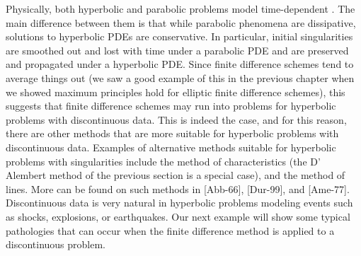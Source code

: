 \documentclass[../main.tex]{subfiles}
\begin{document}
Physically, both hyperbolic and parabolic problems model time-dependent 
. The main difference between them is that while parabolic phenomena are dissipative, solutions to hyperbolic PDEs are conservative. In particular, initial singularities are smoothed out and lost with time under a parabolic PDE and are preserved and propagated under a hyperbolic PDE. Since finite difference schemes tend to average things out (we saw a good example of this in the previous chapter when we showed maximum principles hold for elliptic finite difference schemes), this suggests that finite difference schemes may run into problems for hyperbolic problems with discontinuous data. This is indeed the case, and for this reason, there are other methods that are more suitable for hyperbolic problems with discontinuous data. Examples of alternative methods suitable for hyperbolic problems with singularities include the method of characteristics (the D' Alembert method of the previous section is a special case), and the method of lines. More can be found on such methods in [Abb-66], [Dur-99], and [Ame-77]. Discontinuous data is very natural in hyperbolic problems modeling events such as shocks, explosions, or earthquakes. Our next example will show some typical pathologies that can occur when the finite difference method is applied to a discontinuous problem. 
\\
\\
\end{document}
